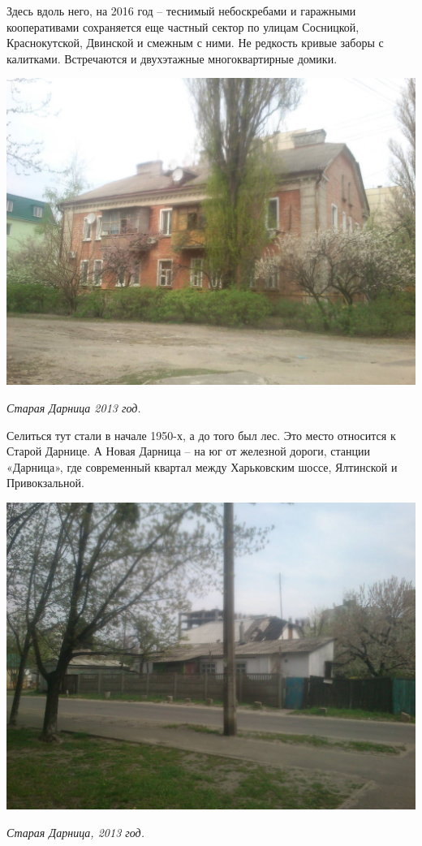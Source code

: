 Здесь вдоль него, на 2016 год – теснимый небоскребами и гаражными кооперативами сохраняется еще частный сектор по улицам Сосницкой, Краснокутской, Двинской и смежным с ними. Не редкость кривые заборы с калитками. Встречаются и двухэтажные многоквартирные домики.

\begin{center}
\includegraphics[width=0.85\linewidth]{chast-gorodki/darn/s_darnica-DSC_0022.JPG}

\textit{Старая Дарница 2013 год.}
\end{center}

Селиться тут стали в начале 1950-х, а до того был лес. Это место относится к Старой Дарнице. А Новая Дарница – на юг от железной дороги, станции «Дарница», где современный квартал между Харьковским шоссе, Ялтинской и Привокзальной.

\begin{center}
\includegraphics[width=\linewidth]{chast-gorodki/darn/s_darnica-DSC_0020.JPG}

\textit{Старая Дарница, 2013 год.}
\end{center}

